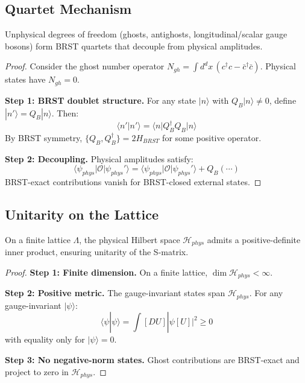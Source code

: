 \subsection{Quartet Mechanism}

\begin{theorem}\label{thm:quartet}
Unphysical degrees of freedom (ghosts, antighosts, longitudinal/scalar gauge bosons) form BRST quartets that decouple from physical amplitudes.
\end{theorem}

\begin{proof}
Consider the ghost number operator $N_{gh} = \int d^dx \, (c^\dagger c - \bar{c}^\dagger \bar{c})$. Physical states have $N_{gh} = 0$.

\textbf{Step 1: BRST doublet structure.} For any state $|n\rangle$ with $Q_B |n\rangle \neq 0$, define $|n'\rangle = Q_B |n\rangle$. Then:
\begin{equation}
    \langle n' | n' \rangle = \langle n | Q_B^\dagger Q_B | n \rangle
\end{equation}
By BRST symmetry, $\{Q_B, Q_B^\dagger\} = 2H_{BRST}$ for some positive operator.

\textbf{Step 2: Decoupling.} Physical amplitudes satisfy:
\begin{equation}
    \langle \psi_{phys} | \mathcal{O} | \psi_{phys}' \rangle = \langle \psi_{phys} | \mathcal{O} | \psi_{phys}' \rangle + Q_B(\cdots)
\end{equation}
BRST-exact contributions vanish for BRST-closed external states.
\end{proof}

\subsection{Unitarity on the Lattice}

\begin{theorem}\label{thm:lattice-unitarity}
On a finite lattice $\Lambda$, the physical Hilbert space $\mathcal{H}_{phys}$ admits a positive-definite inner product, ensuring unitarity of the S-matrix.
\end{theorem}

\begin{proof}
\textbf{Step 1: Finite dimension.} On a finite lattice, $\dim \mathcal{H}_{phys} < \infty$.

\textbf{Step 2: Positive metric.} The gauge-invariant states span $\mathcal{H}_{phys}$. For any gauge-invariant $|\psi\rangle$:
\begin{equation}
    \langle \psi | \psi \rangle = \int [DU] |\psi[U]|^2 \geq 0
\end{equation}
with equality only for $|\psi\rangle = 0$.

\textbf{Step 3: No negative-norm states.} Ghost contributions are BRST-exact and project to zero in $\mathcal{H}_{phys}$.
\end{proof}

